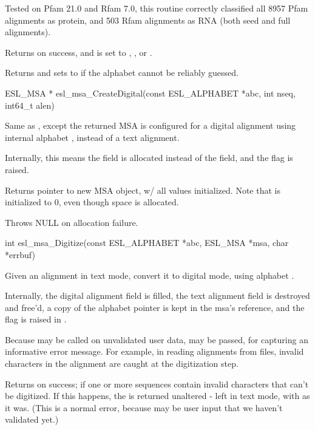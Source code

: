 \begin{sreapi}
Tested on Pfam 21.0 and Rfam 7.0, this routine correctly
classified all 8957 Pfam alignments as protein, and 503
Rfam alignments as RNA (both seed and full alignments).

Returns  on success, and  is set
to , , or . 

Returns  and sets  to
 if the alphabet cannot be reliably guessed.



\hypertarget{func:esl_msa_CreateDigital()}
{\item[ESL\_MSA * esl\_msa\_CreateDigital(const ESL\_ALPHABET *abc, int nseq, int64\_t alen)]}

Same as , except the returned MSA is configured
for a digital alignment using internal alphabet , instead of 
a text alignment.

Internally, this means the  field is allocated instead of
the  field, and the  flag is raised.

Returns pointer to new MSA object, w/ all values initialized.
Note that  is initialized to 0, even though space
is allocated.

Throws NULL on allocation failure.          



\hypertarget{func:esl_msa_Digitize()}
{\item[int esl\_msa\_Digitize(const ESL\_ALPHABET *abc, ESL\_MSA *msa, char *errbuf)]}

Given an alignment  in text mode, convert it to
digital mode, using alphabet .

Internally, the  digital alignment field is filled,
the  text alignment field is destroyed and free'd,
a copy of the alphabet pointer is kept in the msa's
 reference, and the  flag is raised
in .

Because  may be called on
unvalidated user data,  may be passed, for
capturing an informative error message. For example, in
reading alignments from files, invalid characters in the
alignment are caught at the digitization step.

Returns  on success;
 if one or more sequences contain invalid characters
that can't be digitized. If this happens, the  is returned
unaltered - left in text mode, with  as it was. (This is
a normal error, because  may be user input that we 
haven't validated yet.)


\end{sreapi}
